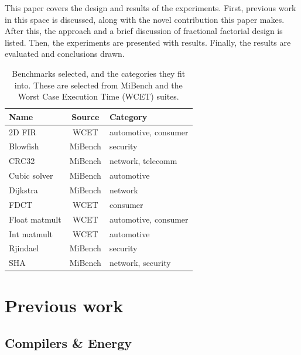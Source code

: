 \documentclass[twocolumn]{article}
\let\oldcaption\caption
\renewcommand{\caption}[1]{\oldcaption{\textup{#1}}}
\begin{document}
This paper covers the design and results of the experiments. First, previous work in this space is discussed, along with the novel contribution this paper makes. After this, the approach and a brief discussion of fractional factorial design is listed. Then, the experiments are presented with results. Finally, the results are evaluated and conclusions drawn.


\begin{table}[t]
	\centering
	\begin{tabular}{l c l}
	\textbf{Name}			& \textbf{Source} 	& \textbf{Category} \\
	\hline
	2D FIR					& WCET 		& automotive, consumer	\\
	Blowfish				& MiBench 	& security	\\
	CRC32					& MiBench 	& network, telecomm	\\
	Cubic solver			& MiBench 	& automotive	\\
	Dijkstra				& MiBench 	& network	\\
	FDCT					& WCET 		& consumer	\\
	Float matmult			& WCET 		& automotive, consumer	\\
	Int matmult				& WCET	 	& automotive	\\
	Rjindael				& MiBench 	& security	\\
	SHA						& MiBench 	& network, security	\\
	\end{tabular}
\caption{Benchmarks selected, and the categories they fit into. These are selected from MiBench\cite{MiBench} and the Worst Case Execution Time (WCET)\cite{WCET} suites.}
\label{Table:Benchmarks}
\end{table}


\section{Previous work}

\subsection{Compilers \& Energy}
\end{document}
